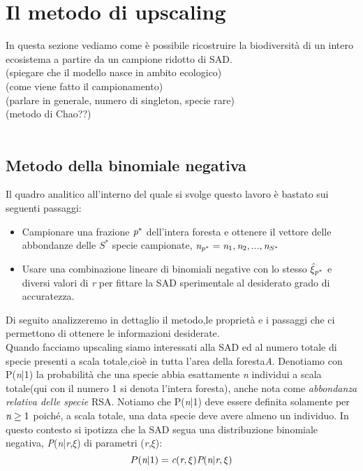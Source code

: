 \chapter{Il metodo di upscaling}
In questa sezione vediamo come è possibile ricostruire la biodiversità di un intero ecosistema a partire da un campione ridotto di SAD. \\
(spiegare che il modello nasce in ambito ecologico)\\
(come viene fatto il campionamento)\\
(parlare in generale, numero di singleton, specie rare)\\
(metodo di Chao??)\\
\\
\section{Metodo della binomiale negativa}
Il quadro analitico all'interno del quale si svolge questo lavoro è bastato sui seguenti passaggi:
\begin{itemize}
    \item Campionare una frazione $\emph{p}^*$ dell'intera foresta e ottenere il vettore delle abbondanze delle $S^*$ specie campionate, $\emph{n}_{\emph{p}^*}={\emph{n}_1,\emph{n}_2,...,\emph{n}_{S^*}}$
    \item Usare una combinazione lineare di binomiali negative con lo stesso $\hat \xi_{\emph{p}^*}$ e diversi valori di \emph{r} per fittare la SAD sperimentale al desiderato grado di accuratezza.
\end{itemize}
Di seguito analizzeremo in dettaglio il metodo,le proprietà e i passaggi che ci permettono di ottenere le informazioni desiderate.\\
Quando facciamo upscaling siamo interessati alla SAD ed al numero totale di specie presenti a scala totale,cioè in tutta l'area della foresta\emph{A}.
Denotiamo con P(\emph{n}|1) la probabilità che una specie abbia esattamente \emph{n} individui a scala totale(qui con il numero 1 si denota l'intera foresta), anche nota come \emph{abbondanza relativa delle specie} RSA.
Notiamo che P(\emph{n}|1) deve essere definita solamente per $\emph{n}\ge1$ poiché, a scala totale, una data specie deve avere almeno un individuo.
In questo contesto si ipotizza che la SAD segua una distribuzione binomiale negativa, \emph{P}(\emph{n}|\emph{r},$\xi$) di parametri (\emph{r},$\xi$):
\begin{equation}
 P(\emph{n}|1)=\emph{c}(\emph{r},\xi)\emph{P}(\emph{n}|\emph{r},\xi)
 \label{eq:NBfunctform}
\end{equation}
